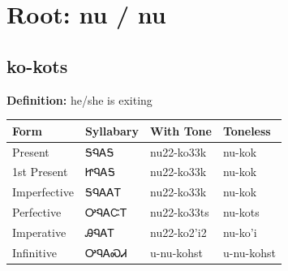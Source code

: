 \documentclass{article}%
\begin{document}
%
\normalsize%
\section*{Root: nu / nu}%
\subsection*{ko-kots}%
\textbf{Definition: }%
he/she is exiting%
\\[0.5em]%
\begin{tabular}{|l|l|l|l|}%
\hline%
\textbf{Form}&\textbf{Syllabary}&\textbf{With Tone}&\textbf{Toneless}\\%
\hline%
Present&ᎦᏄᎪᎦ&nu22{-}ko33k&nu{-}kok\\%
1st Present&ᏥᏄᎪᎦ&nu22{-}ko33k&nu{-}kok\\%
Imperfective&ᎦᏄᎪᎪᎢ&nu22{-}ko33k&nu{-}kok\\%
Perfective&ᎤᏄᎪᏨᎢ&nu22{-}ko33ts&nu{-}kots\\%
Imperative&ᎯᏄᎪᎢ&nu22{-}ko2'i2&nu{-}ko'i\\%
Infinitive&ᎤᏄᎪᏍᏗ&u{-}nu{-}kohst&u{-}nu{-}kohst\\%
\hline%
\end{tabular}%
\\[1em]%
\end{document}

